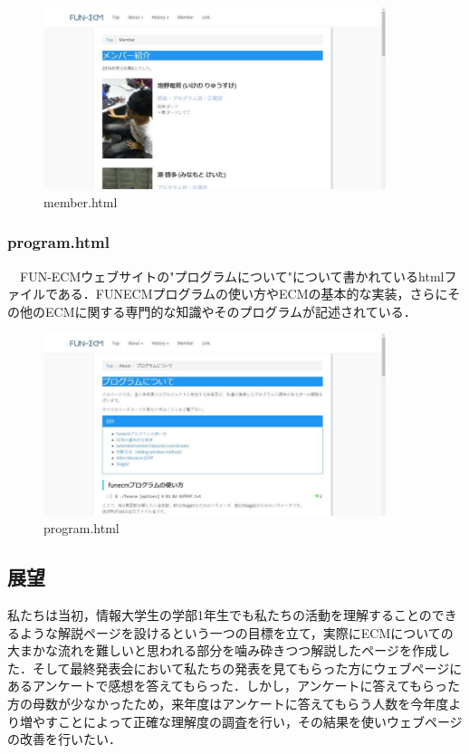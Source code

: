 \documentclass[openany,11pt,papersize]{jsbook}
\begin{document}
\begin{figure}[H]
  \begin{center} %
    \includegraphics[clip, width=10.0cm]{./figure/member.png}
    \caption{member.html} %
    \label{member} %
  \end{center}
\end{figure}

\subsubsection{program.html}
　FUN-ECMウェブサイトの"プログラムについて"について書かれているhtmlファイルである．FUNECMプログラムの使い方やECMの基本的な実装，さらにその他のECMに関する専門的な知識やそのプログラムが記述されている．

\begin{figure}[H]
  \begin{center} %
    \includegraphics[clip, width=10.0cm]{./figure/program.png}
    \caption{program.html} %
    \label{program} %
  \end{center}
\end{figure}


\subsection{展望}
私たちは当初，情報大学生の学部1年生でも私たちの活動を理解することのできるような解説ページを設けるという一つの目標を立て，実際にECMについての大まかな流れを難しいと思われる部分を噛み砕きつつ解説したページを作成した．そして最終発表会において私たちの発表を見てもらった方にウェブページにあるアンケートで感想を答えてもらった．しかし，アンケートに答えてもらった方の母数が少なかったため，来年度はアンケートに答えてもらう人数を今年度より増やすことによって正確な理解度の調査を行い，その結果を使いウェブページの改善を行いたい．
\end{document}
